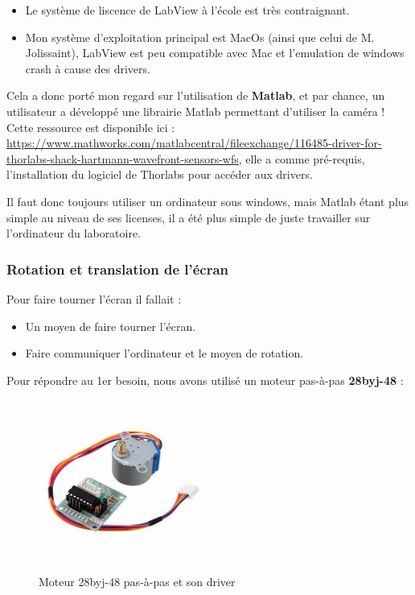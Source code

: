 \begin{itemize}
    \item Le système de liscence de LabView à l'école est très contraignant.
    \item Mon système d'exploitation principal est MacOs (ainsi que celui de M. Jolissaint), LabView est peu compatible avec Mac et l'emulation de windows crash à cause des drivers.
\end{itemize}

Cela a donc porté mon regard sur l'utilisation de \textbf{Matlab}, et par chance, un utilisateur a développé une librairie Matlab permettant d'utiliser la caméra ! Cette ressource est disponible ici :
\url{https://www.mathworks.com/matlabcentral/fileexchange/116485-driver-for-thorlabs-shack-hartmann-wavefront-sensors-wfs}, elle a comme pré-requis, l'installation du logiciel de Thorlabs pour accéder aux drivers.

Il faut donc toujours utiliser un ordinateur sous windows, mais Matlab étant plus simple au niveau de ses licenses, il a été plus simple de juste travailler sur l'ordinateur du laboratoire.

\subsubsection{Rotation et translation de l'écran}
Pour faire tourner l'écran il fallait :
\begin{itemize}
    \item Un moyen de faire tourner l'écran.
    \item Faire communiquer l'ordinateur et le moyen de rotation.
\end{itemize}

Pour répondre au 1er besoin, nous avons utilisé un moteur pas-à-pas \textbf{28byj-48} :
\begin{figure}[H]
    \centering
    \includegraphics[width=0.5\textwidth]{assets/figures/ameliorations/stepper.jpeg}
    \caption[Moteur 28byj-48 pas-à-pas et son driver]{Moteur 28byj-48 pas-à-pas et son driver \autocite{photo_28byj-48}}
\end{figure}

